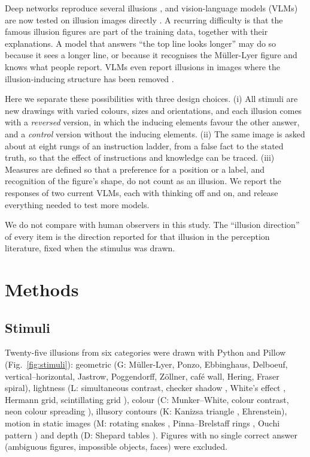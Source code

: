 \documentclass[11pt]{article}
\begin{document}
Deep networks reproduce several illusions \citep{watanabe2018,gomezvilla2019}, and vision-language models (VLMs) are
now tested on illusion images directly \citep{zhang2023grounding,shahgir2024illusionvqa,guan2024hallusionbench}.
A recurring difficulty is that the famous illusion figures are part of the training data, together with their
explanations. A model that answers ``the top line looks longer'' may do so because it sees a longer line, or because
it recognises the Müller-Lyer figure and knows what people report. VLMs even report illusions in images where the
illusion-inducing structure has been removed \citep{ullman2024illusion}.

Here we separate these possibilities with three design choices. (i) All stimuli are new drawings with varied colours,
sizes and orientations, and each illusion comes with a \emph{reversed} version, in which the inducing elements favour
the other answer, and a \emph{control} version without the inducing elements. (ii) The same image is asked about at
eight rungs of an instruction ladder, from a false fact to the stated truth, so that the effect of instructions and
knowledge can be traced. (iii) Measures are defined so that a preference for a position or a label, and recognition of
the figure's shape, do not count as an illusion. We report the responses of two current VLMs, each with thinking off
and on, and release everything needed to test more models.

We do not compare with human observers in this study. The ``illusion direction'' of every item is the direction
reported for that illusion in the perception literature, fixed when the stimulus was drawn.

\section{Methods}

\subsection{Stimuli}

Twenty-five illusions from six categories were drawn with Python and Pillow (Fig.~\ref{fig:stimuli}): geometric (G:
Müller-Lyer, Ponzo, Ebbinghaus, Delboeuf, vertical--horizontal, Jastrow, Poggendorff, Zöllner, café wall, Hering,
Fraser spiral), lightness (L: simultaneous contrast, checker shadow \citep{adelson1995}, White's effect
\citep{white1979}, Hermann grid, scintillating grid \citep{schrauf1997}), colour (C: Munker--White, colour contrast,
neon colour spreading \citep{vantuijl1975}), illusory contours (K: Kanizsa triangle \citep{kanizsa1955}, Ehrenstein),
motion in static images (M: rotating snakes \citep{kitaoka2003}, Pinna--Brelstaff rings \citep{pinna2000}, Ouchi
pattern \citep{ouchi1977}) and depth (D: Shepard tables \citep{shepard1990}). Figures with no single correct answer
(ambiguous figures, impossible objects, faces) were excluded.
\end{document}
